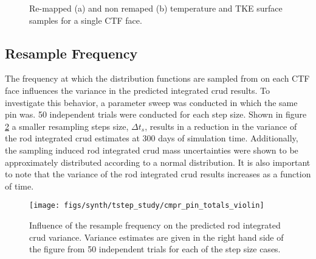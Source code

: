 \begin{figure}[H]%
    \centering
    \qquad
    \caption[Re-mapped and non-remaped temperature and TKE surface samples]{Re-mapped (a) and non remaped (b) temperature and TKE surface samples for a single CTF face.}%
    \label{fig:remmap_comp}%
\end{figure}

\subsection{Resample Frequency}
\label{sec:resample_freq_study}

The frequency at which the distribution functions are sampled from on each CTF face influences the variance in the predicted integrated crud results.  To investigate this behavior, a parameter sweep was conducted in which the same pin was.  50 independent trials were conducted for each step size.  Shown in figure \ref{fig:cmprpintotalsviolin} a smaller resampling steps size, $\Delta t_s$, results in a reduction in the variance of the rod integrated crud estimates at 300 days of simulation time.   Additionally, the sampling induced rod integrated crud mass uncertainties were shown to be approximately distributed according to a normal distribution.  It is also important to note that the variance of the rod integrated crud results increases as a function of time.

\begin{figure}[H]
    \centering
    \texttt{[image: figs/synth/tstep\_study/cmpr\_pin\_totals\_violin]}
    \caption[Influence of the resample frequency on the predicted integrated crud variance.]{Influence of the resample frequency on the predicted rod integrated crud variance.  Variance estimates are given in the right hand side of the figure from 50 independent trials for each of the step size cases.}
    \label{fig:cmprpintotalsviolin}
\end{figure}

